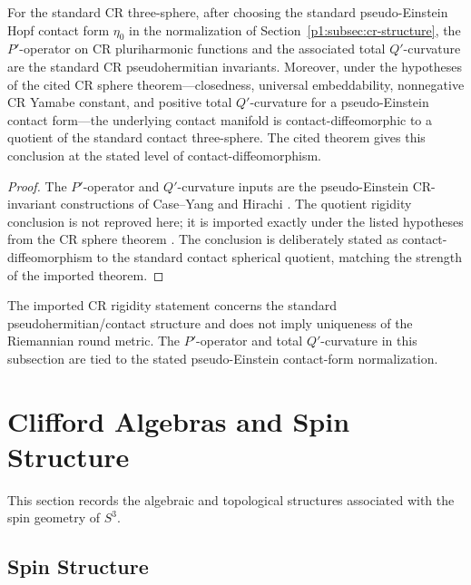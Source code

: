 \documentclass[11pt]{article}
\begin{document}
\begin{theorem}
\label{p1a:theorem:atlas-cr-sphere-rigidity-package-38671ac}

For the standard CR three-sphere, after choosing the standard pseudo-Einstein Hopf contact form \(\eta_0\) in the normalization of Section~\ref{p1:subsec:cr-structure}, the \(P'\)-operator on CR pluriharmonic functions and the associated
total \(Q'\)-curvature are the standard CR pseudohermitian invariants.  Moreover,
under the hypotheses of the cited CR sphere theorem---closedness, universal
embeddability, nonnegative CR Yamabe constant, and positive total \(Q'\)-curvature
for a pseudo-Einstein contact form---the underlying contact manifold is
contact-diffeomorphic to a quotient of the standard contact three-sphere.  The cited theorem gives this conclusion at the stated level of contact-diffeomorphism.
\end{theorem}

\begin{proof}
The \(P'\)-operator and \(Q'\)-curvature inputs are the pseudo-Einstein
CR-invariant constructions of Case--Yang and Hirachi
\cite{caseYang2013Pprime,hirachi2014Qprime}.  The quotient rigidity conclusion is
not reproved here; it is imported exactly under the listed hypotheses from the CR
sphere theorem \cite{caseYang2025CRSphere}.  The conclusion is deliberately stated
as contact-diffeomorphism to the standard contact spherical quotient, matching the
strength of the imported theorem.
\end{proof}

\begin{remark}
The imported CR rigidity statement concerns the standard
pseudohermitian/contact structure and does not imply uniqueness of the
Riemannian round metric.  The \(P'\)-operator and total \(Q'\)-curvature in this
subsection are tied to the stated pseudo-Einstein contact-form normalization.
\end{remark}


\section{Clifford Algebras and Spin Structure}
\label{p1:sec:clifford-bott}

This section records the algebraic and topological structures associated with the spin geometry of $S^3$.

\subsection{Spin Structure}
\end{document}
